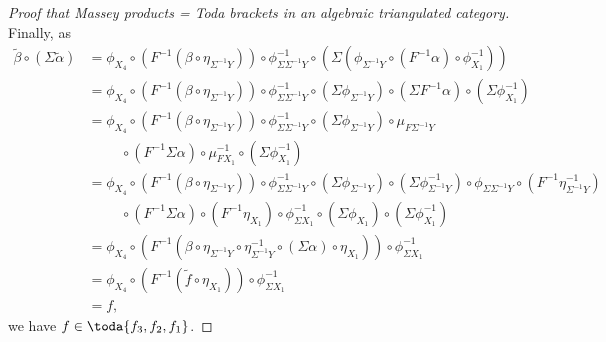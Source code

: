 \begin{proof}[Proof that Massey products = Toda brackets in an algebraic triangulated category]
    Finally, as
    \begin{align*}
        \tilde{\beta} \circ (\Sigma \tilde{\alpha}) &= \phi_{X_4} \circ (F^{-1} (\beta \circ \eta_{\Sigma^{-1} Y})) \circ \phi^{-1}_{\Sigma \Sigma^{-1} Y} \circ
        (\Sigma (\phi_{\Sigma^{-1} Y} \circ (F^{-1} \alpha) \circ \phi^{-1}_{X_1})) \\
        &= \phi_{X_4} \circ (F^{-1} (\beta \circ \eta_{\Sigma^{-1} Y})) \circ \phi^{-1}_{\Sigma \Sigma^{-1} Y} \circ
        (\Sigma \phi_{\Sigma^{-1} Y}) \circ (\Sigma F^{-1} \alpha) \circ (\Sigma \phi^{-1}_{X_1}) \\
        &= \phi_{X_4} \circ (F^{-1} (\beta \circ \eta_{\Sigma^{-1} Y})) \circ \phi^{-1}_{\Sigma \Sigma^{-1} Y} \circ
        (\Sigma \phi_{\Sigma^{-1} Y}) \circ \mu_{F \Sigma^{-1} Y} \\
        &\hspace{1cm} \circ (F^{-1} \Sigma \alpha) \circ \mu^{-1}_{F X_1} \circ (\Sigma \phi^{-1}_{X_1}) \\
        &= \phi_{X_4} \circ (F^{-1} (\beta \circ \eta_{\Sigma^{-1} Y})) \circ \phi^{-1}_{\Sigma \Sigma^{-1} Y} \circ
        (\Sigma \phi_{\Sigma^{-1} Y}) \circ (\Sigma \phi^{-1}_{\Sigma^{-1} Y}) \circ \phi_{\Sigma \Sigma^{-1} Y} \circ (F^{-1} \eta^{-1}_{\Sigma^{-1} Y}) \\
        &\hspace{1cm} \circ (F^{-1} \Sigma \alpha) \circ (F^{-1} \eta_{X_1}) \circ \phi^{-1}_{\Sigma X_1} \circ (\Sigma \phi_{X_1}) \circ (\Sigma \phi^{-1}_{X_1}) \\
        &= \phi_{X_4} \circ (F^{-1} (\beta \circ \eta_{\Sigma^{-1} Y} \circ \eta^{-1}_{\Sigma^{-1} Y} \circ (\Sigma \alpha) \circ \eta_{X_1})) \circ \phi^{-1}_{\Sigma X_1} \\
        &= \phi_{X_4} \circ (F^{-1} (\tilde{f} \circ \eta_{X_1})) \circ \phi^{-1}_{\Sigma X_1} \\
        &= f,
    \end{align*}
    we have \( f \in \toda{f_3, f_2, f_1} \).
\end{proof}